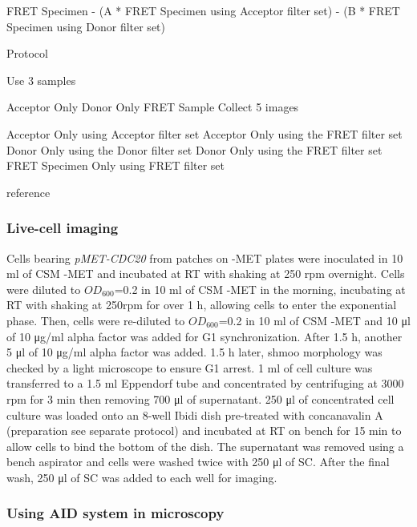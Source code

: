 FRET Specimen - (A * FRET Specimen using Acceptor filter set) - (B * FRET Specimen using Donor filter set)

Protocol

Use 3 samples

Acceptor Only
Donor Only
FRET Sample
Collect 5 images

Acceptor Only using Acceptor filter set
Acceptor Only using the FRET filter set
Donor Only using the Donor filter set
Donor Only using the FRET filter set
FRET Specimen Only using FRET filter set

reference \citep{Gordon1998QuantitativeMicroscopy}

\subsubsection{Live-cell imaging}
Cells bearing \textit{pMET-CDC20} from patches on -MET plates were inoculated in 10 \si{\milli\litre} of CSM -MET and incubated at RT with shaking at 250 rpm overnight. Cells were diluted to $OD_{600}$=0.2 in 10 \si{\milli\litre} of CSM -MET in the morning, incubating at RT with shaking at 250rpm for over 1 \si{\hour}, allowing cells to enter the exponential phase. Then, cells were re-diluted to $OD_{600}$=0.2 in 10 \si{\milli\litre} of CSM -MET and 10 \si{\micro\litre} of 10 \si{\micro\gram/\milli\litre} alpha factor was added for G1 synchronization. After 1.5 \si{\hour}, another 5 \si{\micro\litre} of 10 \si{\micro\gram/\milli\litre} alpha factor was added. 1.5 \si{\hour} later, shmoo morphology was checked by a light microscope to ensure G1 arrest. 1 \si{\milli\litre} of cell culture was transferred to a 1.5 \si{\milli\litre} Eppendorf tube and concentrated by centrifuging at 3000 rpm for 3 \si{\minute} then removing 700 \si{\micro\litre} of supernatant. 250 \si{\micro\litre} of concentrated cell culture was loaded onto an 8-well Ibidi dish pre-treated with concanavalin A (preparation see separate protocol) and incubated at RT on bench for 15 \si{\minute} to allow cells to bind the bottom of the dish. The supernatant was removed using a bench aspirator and cells were washed twice with 250 \si{\micro\litre} of SC. After the final wash, 250 \si{\micro\litre} of SC was added to each well for imaging. 


\subsubsection{Using AID system in microscopy}

